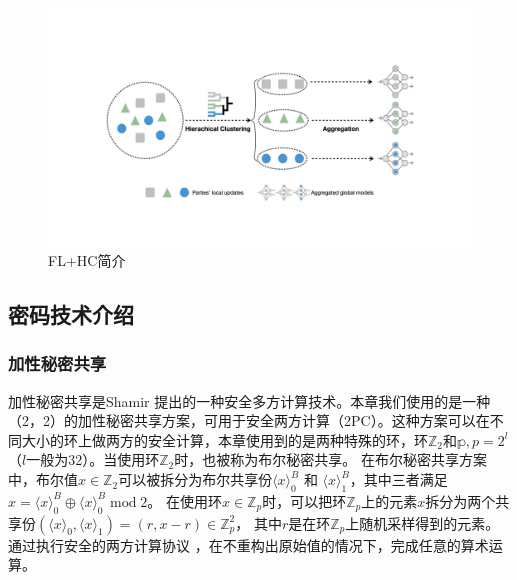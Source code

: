 \begin{figure}[htbp]
    \begin{center}
        \includegraphics[scale=0.13]{figures/work2figs/hc.jpg}
        \caption{FL+HC简介}
        \label{hcjpg}
    \end{center}
\end{figure}

\subsection{密码技术介绍}

\subsubsection{加性秘密共享}
加性秘密共享是Shamir \cite{shamir1979share} 提出的一种安全多方计算技术。本章我们使用的是一种（2，2）的加性秘密共享方案，可用于安全两方计算（2PC）。这种方案可以在不同大小的环上做两方的安全计算，本章使用到的是两种特殊的环，环$\mathbb{Z}_2$和$\mathbb{p}, p=2^l$（$l$一般为32）。当使用环$\mathbb{Z}_2$时，也被称为布尔秘密共享。
在布尔秘密共享方案中，布尔值$x \in \mathbb{Z}_2$可以被拆分为布尔共享份$\langle x\rangle_0^B$ 和 $\langle x\rangle_1^B$，其中三者满足$x = \langle x\rangle_0^B \oplus \langle x\rangle_0^B\;\text{mod}\;2$。
在使用环$x \in \mathbb{Z}_p$时，可以把环$\mathbb{Z}_p$上的元素$x$拆分为两个共享份$(\langle x\rangle_0, \langle x\rangle_1) = (r, x -r) \in \mathbb{Z}_p^2$， 其中$r$是在环$\mathbb{Z}_p$上随机采样得到的元素。通过执行安全的两方计算协议 \cite{rathee2020cryptflow2, rathee2021sirnn}，在不重构出原始值的情况下，完成任意的算术运算。

